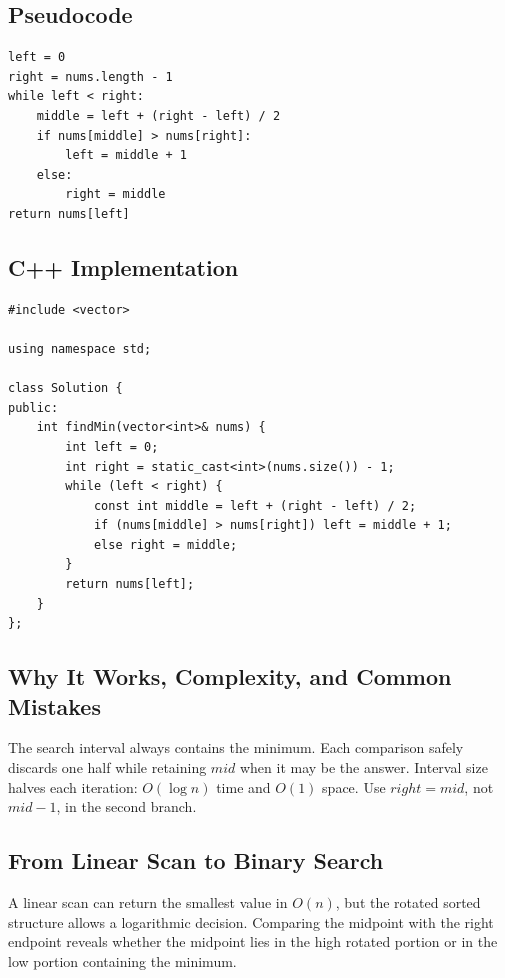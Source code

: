 \subsection{Pseudocode}
\begin{lstlisting}[style=pseudocode]
left = 0
right = nums.length - 1
while left < right:
    middle = left + (right - left) / 2
    if nums[middle] > nums[right]:
        left = middle + 1
    else:
        right = middle
return nums[left]
\end{lstlisting}

\subsection{C++ Implementation}
\begin{lstlisting}[style=compactcode,caption={Complete C++ solution: Find Minimum in Rotated Sorted Array}]
#include <vector>

using namespace std;

class Solution {
public:
    int findMin(vector<int>& nums) {
        int left = 0;
        int right = static_cast<int>(nums.size()) - 1;
        while (left < right) {
            const int middle = left + (right - left) / 2;
            if (nums[middle] > nums[right]) left = middle + 1;
            else right = middle;
        }
        return nums[left];
    }
};
\end{lstlisting}

\subsection{Why It Works, Complexity, and Common Mistakes}
The search interval always contains the minimum. Each comparison safely
discards one half while retaining \(mid\) when it may be the answer. Interval
size halves each iteration: \(O(\log n)\) time and \(O(1)\) space. Use
\(right=mid\), not \(mid-1\), in the second branch.

\subsection{From Linear Scan to Binary Search}
A linear scan can return the smallest value in \(O(n)\), but the rotated
sorted structure allows a logarithmic decision. Comparing the midpoint with
the right endpoint reveals whether the midpoint lies in the high rotated
portion or in the low portion containing the minimum.

